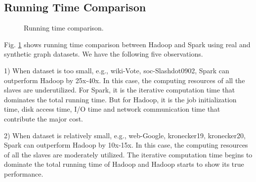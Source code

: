 \documentclass[10pt,conference,compsocconf]{IEEEtran}
\begin{document}
\subsection{Running Time Comparison}

\begin{figure}[!t]
\centering
{}
\caption{Running time comparison.}
\label{fig:hadoopsparkrunningtime}
\end{figure}

Fig. \ref{fig:hadoopsparkrunningtime} shows running time comparison between Hadoop and Spark using real and synthetic graph datasets. We have the following five observations. 

1) When dataset is too small, e.g., wiki-Vote, soc-Slashdot0902, Spark can outperform Hadoop by 25x-40x. In this case, the computing resources of all the slaves are underutilized. For Spark, it is the iterative computation time that dominates the total running time. But for Hadoop, it is the job initialization time, disk access time, I/O time and network communication time that contribute the major cost.   %

2) When dataset is relatively small, e.g., web-Google, kronecker19, kronecker20, Spark can outperform Hadoop by 10x-15x. In this case, the computing resources of all the slaves are moderately utilized. The iterative computation time begins to dominate the total running time of Hadoop and Hadoop starts to show its true performance.
\end{document}

